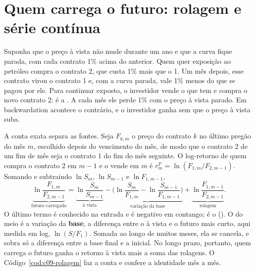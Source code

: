 \section{Quem carrega o futuro: rolagem e série contínua}
\label{sec:c09-rolagem}

Suponha que o preço à vista não mude durante um ano e que a curva fique parada, com cada contrato 1\% acima do anterior. Quem quer exposição ao petróleo compra o contrato 2, que custa 1\% mais que o 1. Um mês depois, esse contrato virou o contrato 1 e, com a curva parada, vale 1\% menos do que se pagou por ele. Para continuar exposto, o investidor vende o que tem e compra o novo contrato 2: é a . A cada mês ele perde 1\% com o preço à vista parado. Em backwardation acontece o contrário, e o investidor ganha sem que o preço à vista suba.


A conta exata separa as fontes. Seja $F_{k,m}$ o preço do contrato $k$ no último pregão do mês $m$, escolhido depois do vencimento do mês, de modo que o contrato 2 de um fim de mês seja o contrato 1 do fim do mês seguinte. O log-retorno de quem compra o contrato 2 em $m-1$ e o vende em $m$ é $r^F_m = \ln(F_{1,m}/F_{2,m-1})$. Somando e subtraindo $\ln S_m$, $\ln S_{m-1}$ e $\ln F_{1,m-1}$,
\begin{equation}
  \underbrace{\ln\frac{F_{1,m}}{F_{2,m-1}}}_{\text{futuro carregado}}
  = \underbrace{\ln\frac{S_m}{S_{m-1}}}_{\text{à vista}}
  - \underbrace{\Big(\ln\frac{S_m}{F_{1,m}} - \ln\frac{S_{m-1}}{F_{1,m-1}}\Big)}_{\text{variação da base}}
  + \underbrace{\ln\frac{F_{1,m-1}}{F_{2,m-1}}}_{\text{rolagem}} .
  \label{eq:c09-decomposicao}
\end{equation}
O último termo é conhecido na entrada e é negativo em contango; é o  (). O do meio é a variação da \textbf{base}, a diferença entre o à vista e o futuro mais curto, aqui medida em log, $\ln(S/F_1)$. Somada ao longo de muitos meses, ela se cancela, e sobra só a diferença entre a base final e a inicial. No longo prazo, portanto, quem carrega o futuro ganha o retorno à vista mais a soma das rolagens. O Código~\ref{cod:c09-rolagem} faz a conta e confere a identidade mês a mês.

